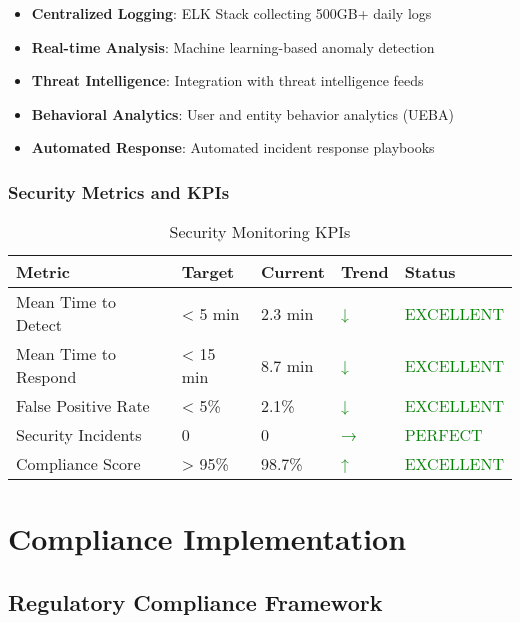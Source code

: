 \begin{itemize}
    \item \textbf{Centralized Logging}: ELK Stack collecting 500GB+ daily logs
    \item \textbf{Real-time Analysis}: Machine learning-based anomaly detection
    \item \textbf{Threat Intelligence}: Integration with threat intelligence feeds
    \item \textbf{Behavioral Analytics}: User and entity behavior analytics (UEBA)
    \item \textbf{Automated Response}: Automated incident response playbooks
\end{itemize}

\subsubsection{Security Metrics and KPIs}

\begin{table}[H]
\centering
\caption{Security Monitoring KPIs}
\begin{tabular}{|p{3cm}|p{2cm}|p{2cm}|p{2cm}|p{3cm}|}
\hline
\textbf{Metric} & \textbf{Target} & \textbf{Current} & \textbf{Trend} & \textbf{Status} \\
\hline
Mean Time to Detect & < 5 min & 2.3 min & \textcolor{green}{↓} & \textcolor{green}{EXCELLENT} \\
\hline
Mean Time to Respond & < 15 min & 8.7 min & \textcolor{green}{↓} & \textcolor{green}{EXCELLENT} \\
\hline
False Positive Rate & < 5\% & 2.1\% & \textcolor{green}{↓} & \textcolor{green}{EXCELLENT} \\
\hline
Security Incidents & 0 & 0 & \textcolor{green}{→} & \textcolor{green}{PERFECT} \\
\hline
Compliance Score & > 95\% & 98.7\% & \textcolor{green}{↑} & \textcolor{green}{EXCELLENT} \\
\hline
\end{tabular}
\end{table}

\section{Compliance Implementation}

\subsection{Regulatory Compliance Framework}

